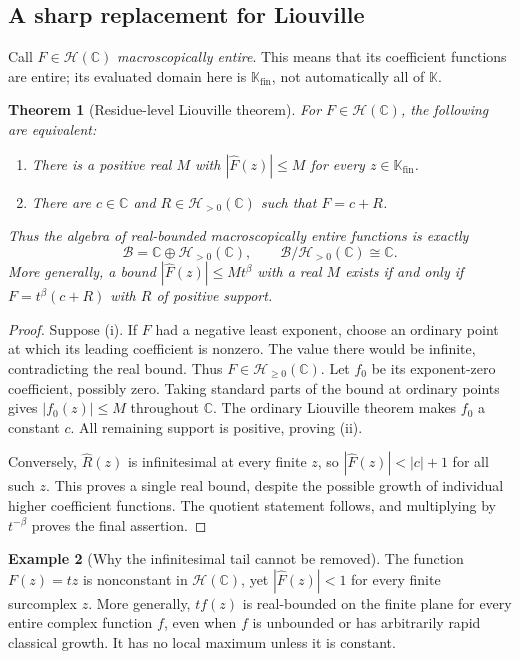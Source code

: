\documentclass[11pt,oneside]{article}
\newtheorem{theorem}{Theorem}[section]
\theoremstyle{definition}\newtheorem{definition}[theorem]{Definition}
\newtheorem{example}[theorem]{Example}
\newcommand{\K}{\mathbb K}
\newcommand{\C}{\mathbb C}
\newcommand{\HH}{\mathcal H}
\newcommand{\hatF}{\widehat F}
\newcommand{\Fin}{\K_{\mathrm{fin}}}
\begin{document}
\subsection{A sharp replacement for Liouville}\label{sec:liouville}
Call $F\in\HH(\C)$ \emph{macroscopically entire}. This means that its coefficient functions are entire; its evaluated domain here is $\Fin$, not automatically all of $\K$.

\begin{theorem}[Residue-level Liouville theorem]\label{thm:liouville}
For $F\in\HH(\C)$, the following are equivalent:
\begin{enumerate}[label=(\roman*)]
\item There is a positive real $M$ with $|\hatF(z)|\leq M$ for every $z\in\Fin$.
\item There are $c\in\C$ and $R\in\HH_{>0}(\C)$ such that $F=c+R$.
\end{enumerate}
Thus the algebra of real-bounded macroscopically entire functions is exactly
\begin{equation}\label{eq:liouvillealgebra}
 \mathcal B=\C\oplus\HH_{>0}(\C),\qquad
 \mathcal B/\HH_{>0}(\C)\cong\C.
\end{equation}
More generally, a bound $|\hatF(z)|\leq Mt^\beta$ with a real $M$ exists if and only if $F=t^\beta(c+R)$ with $R$ of positive support.
\end{theorem}
\begin{proof}
Suppose (i). If $F$ had a negative least exponent, choose an ordinary point at which its leading coefficient is nonzero. The value there would be infinite, contradicting the real bound. Thus $F\in\HH_{\geq0}(\C)$. Let $f_0$ be its exponent-zero coefficient, possibly zero. Taking standard parts of the bound at ordinary points gives $|f_0(z)|\leq M$ throughout $\C$. The ordinary Liouville theorem makes $f_0$ a constant $c$. All remaining support is positive, proving (ii).

Conversely, $\widehat R(z)$ is infinitesimal at every finite $z$, so $|\hatF(z)|<|c|+1$ for all such $z$. This proves a single real bound, despite the possible growth of individual higher coefficient functions. The quotient statement follows, and multiplying by $t^{-\beta}$ proves the final assertion.
\end{proof}

\begin{example}[Why the infinitesimal tail cannot be removed]
The function $F(z)=tz$ is nonconstant in $\HH(\C)$, yet $|\hatF(z)|<1$ for every finite surcomplex $z$. More generally, $t f(z)$ is real-bounded on the finite plane for every entire complex function $f$, even when $f$ is unbounded or has arbitrarily rapid classical growth. It has no local maximum unless it is constant.
\end{example}
\end{document}
